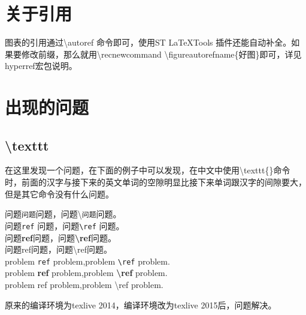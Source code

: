 \section{关于引用}
图表的引用通过{\ttfamily \textbackslash autoref} 命令即可，使用ST LaTeXTools 插件还能自动补全。如果要修改前缀，那么就用{\ttfamily \textbackslash recnewcommand \textbackslash figureautorefname\{好图\}}即可，详见hyperref宏包说明。

\section{出现的问题}
\subsection{\textbackslash texttt}
在这里发现一个问题，在下面的例子中可以发现，在中文中使用\textbackslash texttt\{\}命令时，前面的汉字与接下来的英文单词的空隙明显比接下来单词跟汉字的间隙要大，但是其它命令没有什么问题。

\begin{center}
	\noindent 问题\texttt{问题}问题，问题\textbackslash\texttt{问题}问题。\\
	问题\texttt{ref} 问题，问题\texttt{\textbackslash ref} 问题。\\
	问题\textbf{ref}问题，问题\textbf{\textbackslash ref}问题。\\
	问题\textsf{ref}问题，问题\textsf{\textbackslash ref}问题。\\
	problem \texttt{ref} problem,problem \texttt{\textbackslash ref} problem.\\
	problem \textbf{ref} problem,problem \textbf{\textbackslash ref} problem.\\
	problem \textsf{ref} problem,problem \textsf{\textbackslash ref} problem.
\end{center}

原来的编译环境为texlive 2014，编译环境改为texlive 2015后，问题解决。
